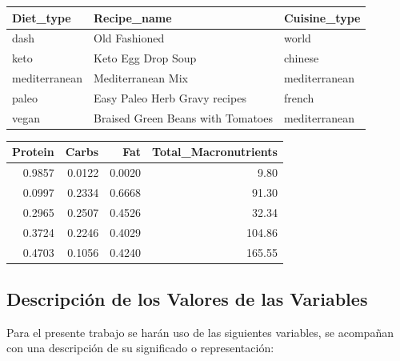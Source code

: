 \documentclass[12pt,a4paper]{article}
\begin{document}
        \begin{center}

            \begin{tabular}{lll}
                \toprule
                    \textbf{Diet\_type} & \textbf{Recipe\_name} & \textbf{Cuisine\_type} \\
                \midrule
                    dash          & Old Fashioned                     & world \\
                    keto          & Keto Egg Drop Soup                & chinese \\
                    mediterranean & Mediterranean Mix                 & mediterranean \\
                    paleo         & Easy Paleo Herb Gravy recipes     & french \\
                    vegan         & Braised Green Beans with Tomatoes & mediterranean \\
                \bottomrule
            \end{tabular}

        \end{center}

        \begin{center}

            \begin{tabular}{rrrr}
                \toprule
                    \textbf{Protein} & \textbf{Carbs} & \textbf{Fat} & \textbf{Total\_Macronutrients} \\
                \midrule
                    0.9857 & 0.0122 & 0.0020 &   9.80 \\
                    0.0997 & 0.2334 & 0.6668 &  91.30 \\
                    0.2965 & 0.2507 & 0.4526 &  32.34 \\
                    0.3724 & 0.2246 & 0.4029 & 104.86 \\
                    0.4703 & 0.1056 & 0.4240 & 165.55 \\
                \bottomrule
            \end{tabular}

        \end{center}

    \subsection{Descripción de los Valores de las Variables}

        Para el presente trabajo se harán uso de las siguientes variables, se 
        acompañan con una descripción de su significado o representación:
\end{document}
